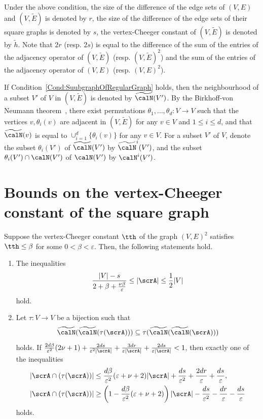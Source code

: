 Under the above condition, the size of the difference of the edge sets of $(V, E)$ and $(V, \widetilde E)$ is denoted by $r$, the size of the difference of the edge sets of their square graphs is denoted by $s$, the vertex-Cheeger constant of $(V, \widetilde E)$ is denoted by $\widetilde h$. Note that $2r$ (resp. $2s$) is equal to the difference of the sum of the entries of the adjacency operator of $(V, \widetilde E)$ (resp. $(V, \widetilde E)^2$) and the sum of the entries of the adjacency operator of $(V, E)$ (resp. $(V, E)^2$). 

\begin{remark}
\label{Rk:NotationsCalN}
If Condition~\ref{Cond:SuubgraphOfRegularGraph} holds, then the neighbourhood of a subset $V'$ of $V$ in $(V, \widetilde E)$ is denoted by $\widetilde \calN(V')$. By the Birkhoff-von Neumann theorem~\cite[Theorem~5.5]{vanLintWilsonCourseCombi}, there exist permutations $\theta_1, \ldots, \theta_d: V\to V$ such that the vertices $v, \theta_i(v)$ are adjacent in $(V, \widetilde E)$ for any $v\in V$ and $1\leq i \leq d$, and that $\widetilde \calN(v)$ is equal to $\cup_{i=1}^d \{\theta_i(v)\}$ for any $v\in V$. For a subset $V'$ of $V$, denote the subset $\theta_i(V')$ of $\widetilde \calN(V')$ by $\widetilde \calN^i(V')$, and the subset $\theta_i(V') \cap \calN (V')$ of $\calN(V')$ by $\calN^i(V')$.
\end{remark}

\section{Bounds on the vertex-Cheeger constant of the square graph}

\begin{proposition}
\label{Prop:AExists}
Suppose the vertex-Cheeger constant $\tth$ of the graph $(V, E)^2$ satisfies $\tth \leq \beta$ for some $0 < \beta < \varepsilon$. Then, the following statements hold. 
\begin{enumerate}
\item 
The inequalities 
$$\frac {|V| -s}{2 + \beta + \frac{\nu\beta}{\varepsilon} } \leq |\scrA| \leq \frac 12 |V|$$ 
hold. 
\item 
Let $\tau: V \to V$ be a bijection such that 
$$
\widetilde\calN (\widetilde\calN(\tau(\scrA)))\subseteq \tau(\widetilde \calN(\widetilde \calN(\scrA))) 
$$
holds. If 
$
\frac {2d\beta} { \varepsilon^2} ( 2\nu + 1) 
+ \frac{2d s}{\varepsilon^2 |\scrA|}
+ \frac{3dr}{\varepsilon |\scrA|}
+ \frac{2ds}{\varepsilon |\scrA|}
<1 
$, then exactly one of the inequalities  
\begin{align*}
|\scrA \cap (\tau(\scrA)) |
& \leq  \frac{d \beta}{\varepsilon^2} (\varepsilon + \nu + 2)|\scrA|+  \frac {ds}{\varepsilon^2} + \frac{2dr}\varepsilon +\frac{ds}{\varepsilon},\\
|\scrA \cap (\tau(\scrA)) |
& \geq \left( 1- \frac {d\beta}{ \varepsilon^2} ( \varepsilon + \nu + 2)\right)|\scrA| - \frac {ds}{\varepsilon^2}
-\frac{dr}{\varepsilon}
-\frac{ds}{\varepsilon} 
\end{align*}
holds.
\end{enumerate}
\end{proposition}

